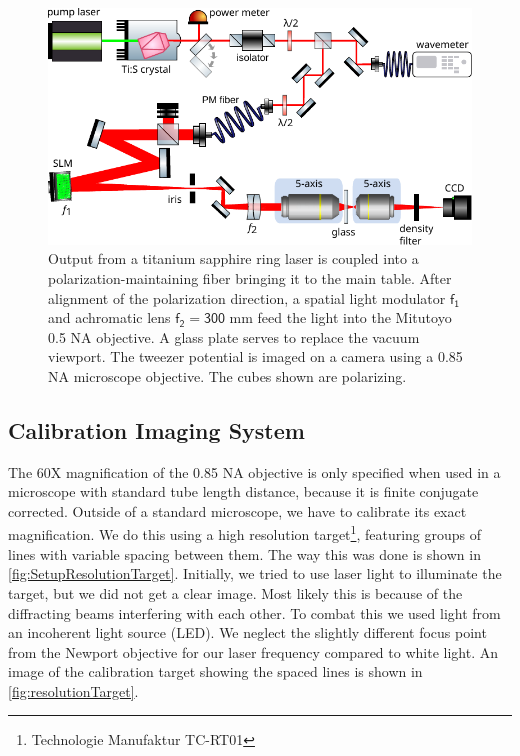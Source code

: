 \begin{figure}
    \centering
    \includegraphics[width=0.95\linewidth]{figures/TiSandSLM.pdf}
    \caption{Output from a titanium sapphire ring laser is coupled into a polarization-maintaining fiber bringing it to the main table. 
    After alignment of the polarization direction, a spatial light modulator $\mathsf{f_1}$ and achromatic lens $\mathsf{f_2 = 300}$ mm feed the light into the Mitutoyo 0.5 NA objective.
    A glass plate serves to replace the vacuum viewport.
    The tweezer potential is imaged on a camera using a 0.85 NA microscope objective.
    The cubes shown are polarizing.}
    \label{fig:TiSandSLMsetup}
\end{figure}

\subsection{Calibration Imaging System}\label{subsec:CameraCalibration}

The 60X magnification of the 0.85 NA objective is only specified when used in a microscope with standard tube length distance, because it is finite conjugate corrected.
Outside of a standard microscope, we have to calibrate its exact magnification.
We do this using a high resolution target\footnote{Technologie Manufaktur TC-RT01}, featuring groups of lines with variable spacing between them. 
The way this was done is shown in \cref{fig:SetupResolutionTarget}.
Initially, we tried to use laser light to illuminate the target, but we did not get a clear image. 
Most likely this is because of the diffracting beams interfering with each other. 
To combat this we used light from an incoherent light source (\ac{LED}). 
We neglect the slightly different focus point from the Newport objective for our laser frequency compared to white light. 
An image of the calibration target showing the spaced lines is shown in \cref{fig:resolutionTarget}.

